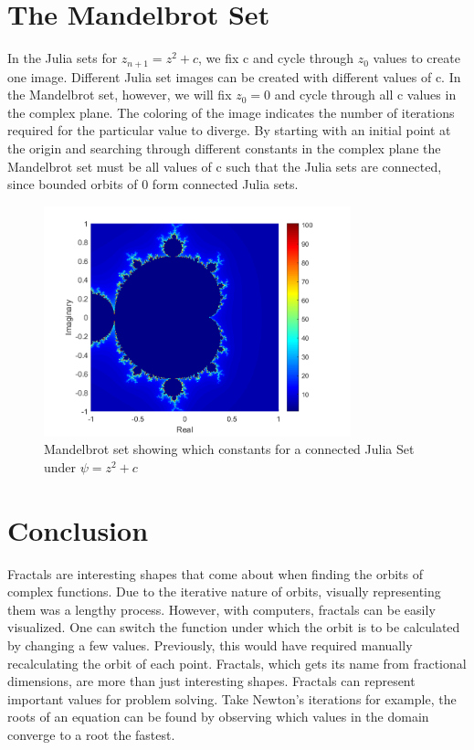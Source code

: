 \documentclass[letterpaper,11pt]{article}
\begin{document}
\section{The Mandelbrot Set}
In the Julia sets for $z_{n+1} = z^2 + c$, we fix c and cycle through $z_0$ values to create one image. Different Julia set images can be created with different values of c. In the Mandelbrot set, however, we will fix $z_0 = 0$ and cycle through all c values in the complex plane. The coloring of the image indicates the number of iterations required for the particular value to diverge. By starting with an initial point at the origin and searching through different constants in the complex plane the Mandelbrot set must be all values of c such that the Julia sets are connected, since bounded orbits of 0 form connected Julia sets.

\begin{figure}
	\centering
	\includegraphics[width=3.5in]{../Figures/Mandelbrot.png}
	\caption{Mandelbrot set showing which constants for a connected Julia Set under $\psi = z^2 + c$}
	\label{fig:Mandelbrot}
\end{figure}

\section{Conclusion}
Fractals are interesting shapes that come about when finding the orbits of complex functions. Due to the iterative nature of orbits, visually representing them was a lengthy process. However, with computers, fractals can be easily visualized. One can switch the function under which the orbit is to be calculated by changing a few values. Previously, this would have required manually recalculating the orbit of each point. Fractals, which gets its name from fractional dimensions, are more than just interesting shapes. Fractals can represent important values for problem solving. Take Newton's iterations for example, the roots of an equation can be found by observing which values in the domain converge to a root the fastest. 
\end{document}
